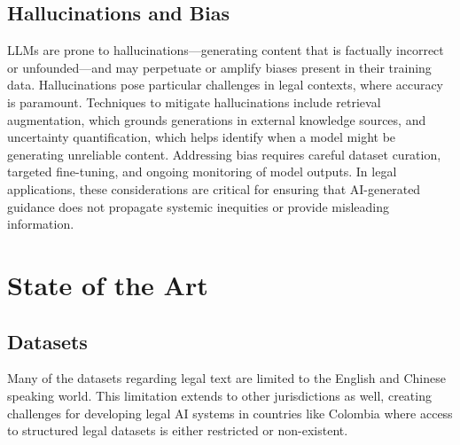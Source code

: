 \subsection{Hallucinations and Bias}
LLMs are prone to hallucinations—generating content that is factually incorrect 
or unfounded—and may perpetuate or amplify biases present in their training data. 
Hallucinations pose particular challenges in legal contexts, where accuracy is 
paramount. Techniques to mitigate hallucinations include retrieval augmentation, 
which grounds generations in external knowledge sources, and uncertainty 
quantification, which helps identify when a model might be generating unreliable 
content. Addressing bias requires careful dataset curation, targeted fine-tuning, 
and ongoing monitoring of model outputs. In legal applications, these considerations 
are critical for ensuring that AI-generated guidance does not propagate systemic 
inequities or provide misleading information.

\section{State of the Art}
\subsection{Datasets}
Many of the datasets regarding legal text are limited to the English and
Chinese speaking world. This limitation extends to other jurisdictions as well, 
creating challenges for developing legal AI systems in countries like Colombia 
where access to structured legal datasets is either restricted or non-existent.
